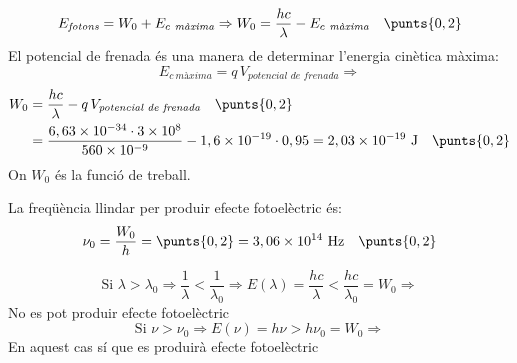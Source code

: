 \begin{solapartat}
\[ E_\textit{fotons} = W_0 + E_{c\ \textit{màxima}} \Rightarrow W_0 = \frac{hc}{\lambda} - E_{c\ \textit{màxima}} \quad\punts{0,2} \]
El potencial de frenada és una manera de determinar l'energia cinètica màxima:
\[ E_{c\ \textit{màxima}} = q\,V_\textit{potencial de frenada} \Rightarrow \]
\begin{align*}
W_0 &= \frac{hc}{\lambda} - q\,V_\textit{potencial de frenada} \quad\punts{0,2}\\
&= \frac{6,63\times 10^{-34}\cdot 3\times 10^{8}}{560\times 10^{-9}} - 1,6\times 10^{-19}\cdot 0,95 = 2,03\times 10^{-19}\ \mathrm{J} \quad\punts{0,2}
\end{align*}
On $W_0$ és la funció de treball.

La freqüència llindar per produir efecte fotoelèctric és:
\[ \nu_0 = \frac{W_0}{h} = \punts{0,2} = 3,06\times 10^{14}\ \mathrm{Hz} \quad\punts{0,2} \]
\end{solapartat}

\begin{solapartat}
\[ \text{Si } \lambda > \lambda_0 \Rightarrow \frac{1}{\lambda} < \frac{1}{\lambda_0} \Rightarrow E(\lambda) = \frac{hc}{\lambda} < \frac{hc}{\lambda_0} = W_0 \Rightarrow \]
No es pot produir efecte fotoelèctric 
\[ \text{Si } \nu > \nu_0 \Rightarrow E(\nu) = h\nu > h\nu_0 = W_0 \Rightarrow \]
En aquest cas sí que es produirà efecte fotoelèctric 
\end{solapartat}
